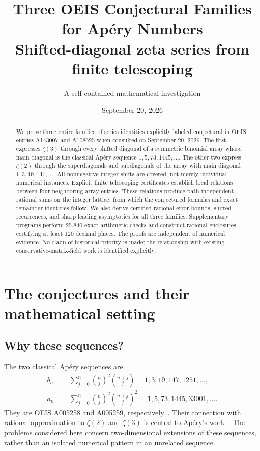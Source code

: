 \documentclass[11pt]{article}
\title{\textbf{Three OEIS Conjectural Families\\for Ap\'ery Numbers}\\[5pt]
\large Shifted-diagonal zeta series from finite telescoping}
\author{A self-contained mathematical investigation}
\date{September 20, 2026}
\numberwithin{equation}{section}
\theoremstyle{definition}
\theoremstyle{remark}
\newcommand{\Apery}{Ap\'ery}
\begin{document}
\maketitle
\begin{abstract}
We prove three entire families of series identities explicitly labeled conjectural
in OEIS entries A143007 and A108625 when consulted on September 20, 2026.
The first expresses $\zeta(3)$ through every shifted diagonal of a symmetric
binomial array whose main diagonal is the classical \Apery{} sequence
$1,5,73,1445,\ldots$. The other two express $\zeta(2)$ through the superdiagonals
and subdiagonals of the array with main diagonal $1,3,19,147,\ldots$.
All nonnegative integer shifts are covered, not merely individual numerical
instances. Explicit finite telescoping certificates establish local relations
between four neighboring array entries. These relations produce path-independent
rational sums on the integer lattice, from which the conjectured formulas and
exact remainder identities follow. We also derive certified rational error
bounds, shifted recurrences, and sharp leading asymptotics for all three
families. Supplementary programs perform 25,840 exact-arithmetic checks and
construct rational enclosures certifying at least 120 decimal places.
The proofs are independent of numerical evidence. No claim of historical
priority is made; the relationship with existing conservative-matrix-field
work is identified explicitly.
\end{abstract}

\newpage
\tableofcontents
\newpage

\section{The conjectures and their mathematical setting}\label{sec:main}

\subsection{Why these sequences?}
The two classical \Apery{} sequences are
\begin{align}
 b_n&=\sum_{j=0}^n\binom nj^2\binom{n+j}j
       =1,3,19,147,1251,\ldots,\label{eq:b}\\
 a_n&=\sum_{j=0}^n\binom nj^2\binom{n+j}j^2
       =1,5,73,1445,33001,\ldots.\label{eq:a}
\end{align}
They are OEIS A005258 and A005259, respectively~\cite{oeis258,oeis259}.
Their connection with rational approximation to $\zeta(2)$ and $\zeta(3)$
is central to \Apery{}'s work~\cite{apery,david}. The problems considered here
concern two-dimensional extensions of these sequences, rather than an
isolated numerical pattern in an unrelated sequence.
\end{document}
